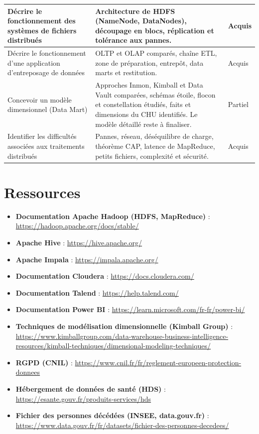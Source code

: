 \begin{center}
\begin{tabular}{|>{\raggedright\arraybackslash}p{}|>{\raggedright\arraybackslash}p{}|m{}|}
Décrire le fonctionnement des systèmes de fichiers distribués &
Architecture de HDFS (NameNode, DataNodes), découpage en blocs, réplication et tolérance aux pannes. &
{\color{green!60!black}Acquis} \\ \hline

Décrire le fonctionnement d'une application d'entreposage de données &
OLTP et OLAP comparés, chaîne ETL, zone de préparation, entrepôt, data marts et restitution. &
{\color{green!60!black}Acquis} \\ \hline

Concevoir un modèle dimensionnel (Data Mart) &
Approches Inmon, Kimball et Data Vault comparées, schémas étoile, flocon et constellation étudiés, faits et dimensions du CHU identifiés. Le modèle détaillé reste à finaliser. &
{\color{orange}Partiel} \\ \hline

Identifier les difficultés associées aux traitements distribués &
Pannes, réseau, déséquilibre de charge, théorème CAP, latence de MapReduce, petits fichiers, complexité et sécurité. &
{\color{green!60!black}Acquis} \\ \hline

\end{tabular}
\end{center}

\newpage
\section*{Ressources}
{}

\begin{itemize}
	\item \textbf{Documentation Apache Hadoop (HDFS, MapReduce)} : \url{https://hadoop.apache.org/docs/stable/}
	\item \textbf{Apache Hive} : \url{https://hive.apache.org/}
	\item \textbf{Apache Impala} : \url{https://impala.apache.org/}
	\item \textbf{Documentation Cloudera} : \url{https://docs.cloudera.com/}
	\item \textbf{Documentation Talend} : \url{https://help.talend.com/}
	\item \textbf{Documentation Power BI} : \url{https://learn.microsoft.com/fr-fr/power-bi/}
	\item \textbf{Techniques de modélisation dimensionnelle (Kimball Group)} : \url{https://www.kimballgroup.com/data-warehouse-business-intelligence-resources/kimball-techniques/dimensional-modeling-techniques/}
	\item \textbf{RGPD (CNIL)} : \url{https://www.cnil.fr/fr/reglement-europeen-protection-donnees}
	\item \textbf{Hébergement de données de santé (HDS)} : \url{https://esante.gouv.fr/produits-services/hds}
	\item \textbf{Fichier des personnes décédées (INSEE, data.gouv.fr)} : \url{https://www.data.gouv.fr/fr/datasets/fichier-des-personnes-decedees/}
\end{itemize}
